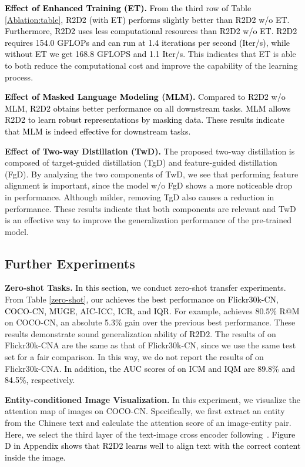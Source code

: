 \documentclass[sigconf]{acmart}
\def\ljc{\textcolor{black}}
\def\xie{\textcolor{black}}
\def\blue{\textcolor{black}}
\def\mmcr{\textcolor{black}}
\begin{document}
\ljc{
\textbf{Effect of Enhanced Training (ET).}
From the third row of Table \ref{Ablation:table},
\blue{\mmcr{R2D2} (with ET) performs slightly better than \mmcr{R2D2} w/o ET.} 
\blue{Furthermore,} \mmcr{R2D2} uses less computational resources than \mmcr{R2D2} w/o ET. \mmcr{R2D2} requires 154.0 GFLOPs and can run at 1.4 iterations per second (Iter/s), while without ET we get 168.8 GFLOPS and 1.1 Iter/s.}
This indicates that ET is able to both reduce the computational cost and improve the capability of the learning process.



\xie{
\textbf{Effect of Masked Language Modeling (MLM).}
Compared to \mmcr{R2D2} w/o MLM,
\mmcr{R2D2} obtains better performance on all downstream tasks.
{MLM allows \mmcr{R2D2} to learn robust representations by masking data.}
These results indicate that MLM is indeed effective for downstream tasks.
}

\textbf{Effect of Two-way Distillation (TwD).} The proposed two-way distillation is composed of target-guided distillation (TgD) and feature-guided distillation (FgD). 
By analyzing the two components of TwD, we see that performing feature alignment is important, since the model w/o FgD shows a more noticeable drop in performance.
Although milder, removing TgD also causes a reduction in performance.
These results indicate that both components are relevant and TwD is an effective way to improve the generalization performance of the pre-trained model.


\subsection{Further Experiments}
\label{sec:further_exp}
\textbf{Zero-shot Tasks.} 
\blue{In this section,}
we conduct zero-shot transfer experiments.
From Table \ref{zero-shot},
\blue{our  achieves the best performance on Flickr30k-CN, COCO-CN, MUGE, AIC-ICC, ICR, and IQR.}
For example,  achieves 80.5\% R@M on COCO-CN, an absolute 5.3\% gain over the previous best performance. 
These results demonstrate sound generalization ability of \mmcr{R2D2}.
The results of  on Flickr30k-CNA are the same as that of Flickr30k-CN, since we use the same test set for a fair comparison.
In this way, we do not report the results of  on Flickr30k-CNA.
\blue{In addition, the AUC scores of  on ICM and IQM are 89.8\% and 84.5\%, respectively.}


\textbf{Entity-conditioned Image Visualization.} In this experiment, we visualize the attention map of images on COCO-CN. Specifically, we first extract an entity from the Chinese text and calculate the attention score of an image-entity pair. Here, we select the third layer of the text-image cross encoder following~\cite{ALBEF}.
\mmcr{Figure D in Appendix shows that \mmcr{R2D2} learns well to align text with the correct content inside the image.}
\end{document}

